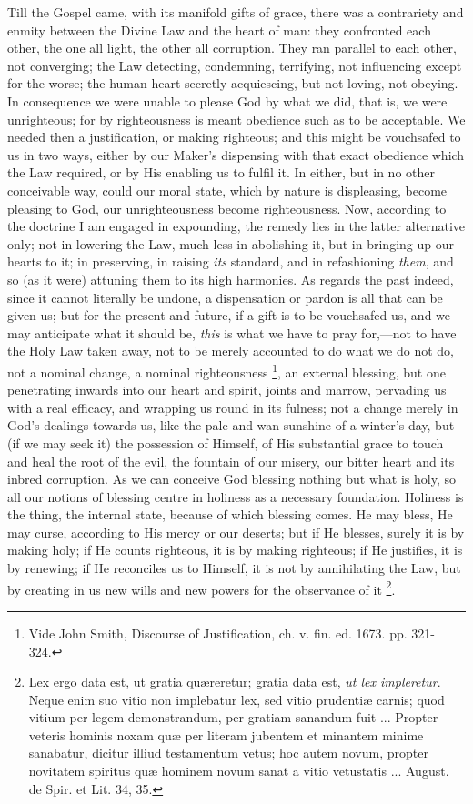 Till the Gospel came, with its manifold gifts of grace, there was a
contrariety and enmity between the Divine Law and the heart of man:
they confronted each other, the one all light, the other all
corruption. They ran parallel to each other, not converging; the Law
detecting, condemning, terrifying, not influencing except for the
worse; the human heart secretly acquiescing, but not loving, not
obeying. In consequence we were unable to please God by what we did,
that is, we were unrighteous; for by righteousness is meant obedience
such as to be acceptable. We needed then a justification, or making
righteous; and this might be vouchsafed to us in two ways, either by
our Maker's dispensing with that exact obedience which the Law
required, or by His enabling us to fulfil it. In either, but in no
other conceivable way, could our moral state, which by nature is
displeasing, become pleasing to God, our unrighteousness become
righteousness. Now, according to the doctrine I am engaged in
expounding, the remedy lies in the latter alternative only; not in
lowering the Law, much less in abolishing it, but in bringing up our
hearts to it; in preserving, in raising \emph{its} standard, and in
refashioning \emph{them}, and so (as it were) attuning them to its
high harmonies. As regards the past indeed, since it cannot literally be undone, a dispensation or pardon is all that can be given
us; but for the present and future, if a gift is to be vouchsafed us,
and we may anticipate what it should be, \emph{this} is what we have
to pray for,—not to have the Holy Law taken away, not to be merely
accounted to do what we do not do, not a nominal change, a nominal
righteousness \footnote{Vide John
Smith, Discourse of Justification, ch. v. fin. ed. 1673. pp. 321-324.}, an
external blessing, but one penetrating inwards into our heart and
spirit, joints and marrow, pervading us with a real efficacy, and
wrapping us round in its fulness; not a change merely in God's
dealings towards us, like the pale and wan sunshine of a winter's day,
but (if we may seek it) the possession of Himself, of His substantial
grace to touch and heal the root of the evil, the fountain of our
misery, our bitter heart and its inbred corruption. As we can conceive
God blessing nothing but what is holy, so all our notions of blessing
centre in holiness as a necessary foundation. Holiness is the thing,
the internal state, because of which blessing comes. He may bless, He
may curse, according to His mercy or our deserts; but if He blesses,
surely it is by making holy; if He counts righteous, it is by making
righteous; if He justifies, it is by renewing; if He reconciles us to
Himself, it is not by annihilating the Law, but by creating in us new
wills and new powers for the observance of it \footnote{Lex ergo data
est, ut gratia quæreretur; gratia data est, \emph{ut lex impleretur}.
Neque enim suo vitio non implebatur lex, sed vitio prudentiæ carnis;
quod vitium per legem demonstrandum, per gratiam sanandum fuit ...
Propter veteris hominis noxam quæ per literam jubentem et minantem
minime sanabatur, dicitur illiud testamentum vetus; hoc autem novum,
propter novitatem spiritus quæ hominem novum sanat a vitio vetustatis
... August. de Spir. et Lit. 34, 35.}.

